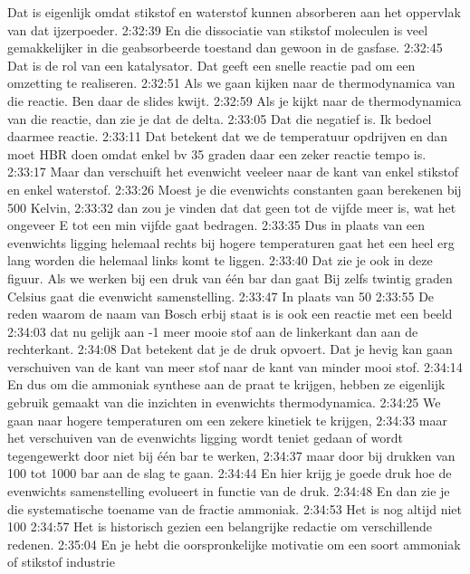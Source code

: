 Dat is eigenlijk omdat stikstof en waterstof kunnen absorberen aan het oppervlak van dat ijzerpoeder.
2:32:39
En die dissociatie van stikstof moleculen is veel gemakkelijker in die geabsorbeerde toestand dan gewoon in de gasfase.
2:32:45
Dat is de rol van een katalysator. Dat geeft een snelle reactie pad om een omzetting te realiseren.
2:32:51
Als we gaan kijken naar de thermodynamica van die reactie. Ben daar de slides kwijt.
2:32:59
Als je kijkt naar de thermodynamica van die reactie, dan zie je dat de delta.
2:33:05
Dat die negatief is. Ik bedoel daarmee reactie.
2:33:11
Dat betekent dat we de temperatuur opdrijven en dan moet HBR doen omdat enkel bv 35 graden daar een zeker reactie tempo is.
2:33:17
Maar dan verschuift het evenwicht veeleer naar de kant van enkel stikstof en enkel waterstof.
2:33:26
Moest je die evenwichts constanten gaan berekenen bij 500 Kelvin,
2:33:32
dan zou je vinden dat dat geen tot de vijfde meer is, wat het ongeveer E tot een min vijfde gaat bedragen.
2:33:35
Dus in plaats van een evenwichts ligging helemaal rechts bij hogere temperaturen gaat het een heel erg lang worden die helemaal links komt te liggen.
2:33:40
Dat zie je ook in deze figuur. Als we werken bij een druk van één bar dan gaat Bij zelfs twintig graden Celsius gaat die evenwicht samenstelling.
2:33:47
In plaats van 50%
2:33:55
De reden waarom de naam van Bosch erbij staat is is ook een reactie met een beeld
2:34:03
dat nu gelijk aan -1 meer mooie stof aan de linkerkant dan aan de rechterkant.
2:34:08
Dat betekent dat je de druk opvoert. Dat je hevig kan gaan verschuiven van de kant van meer stof naar de kant van minder mooi stof.
2:34:14
En dus om die ammoniak synthese aan de praat te krijgen, hebben ze eigenlijk gebruik gemaakt van die inzichten in evenwichts thermodynamica.
2:34:25
We gaan naar hogere temperaturen om een zekere kinetiek te krijgen,
2:34:33
maar het verschuiven van de evenwichts ligging wordt teniet gedaan of wordt tegengewerkt door niet bij één bar te werken,
2:34:37
maar door bij drukken van 100 tot 1000 bar aan de slag te gaan.
2:34:44
En hier krijg je goede druk hoe de evenwichts samenstelling evolueert in functie van de druk.
2:34:48
En dan zie je die systematische toename van de fractie ammoniak.
2:34:53
Het is nog altijd niet 100%
2:34:57
Het is historisch gezien een belangrijke redactie om verschillende redenen.
2:35:04
En je hebt die oorspronkelijke motivatie om een soort ammoniak of stikstof industrie
